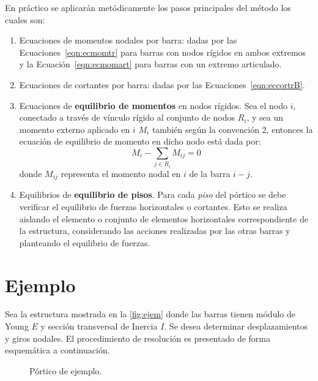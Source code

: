 En práctico se aplicarán metódicamente los pasos principales del método los cuales son:
%
\begin{enumerate}
	\item Ecuaciones de momentos nodales por barra: dadas por las Ecuaciones~\eqref{eqn:ecmomtr} para barras con nodos rígidos en ambos extremos y la Ecuación~\eqref{eqn:ecmomart} para barras con un extremo articulado. 
	
	\item Ecuaciones de cortantes por barra: dadas por las Ecuaciones~\eqref{eqn:eccortrB}.
	\item Ecuaciones de \textbf{equilibrio de momentos} en nodos rígidos. Sea el nodo $i$, conectado a través de vínculo rígido al conjunto de nodos $R_i$, y sea un momento externo aplicado en $i$ $M_i$ también según la convención 2, entonces la ecuación de equilibrio de momento en dicho nodo está dada por:
	$$
	M_i -\sum_{j\in R_i} M_{ij} = 0
	$$
	donde $M_{ij}$ representa el momento nodal en $i$ de la barra $i-j$.
	
	\item Equilibrios de \textbf{equilibrio de pisos}. Para cada \textit{piso} del pórtico se debe verificar el equilibrio de fuerzas horizontales o cortantes. Esto se realiza aislando el elemento o conjunto de elementos horizontales correspondiente de la estructura, considerando las acciones realizadas por las otras barras y planteando el equilibrio de fuerzas.
	
\end{enumerate}


\section{Ejemplo}

Sea la estructura mostrada en la \autoref{fig:ejem} donde las barras tienen módulo de Young $E$ y sección transversal de Inercia $I$. %
%
Se desea determinar desplazamientos y giros nodales. %
El procedimiento de resolución es presentado de forma esquemática a continuación.
%
\begin{figure}[htb]
	\centering
\def\svgwidth{0.6\textwidth}

	\caption{Pórtico de ejemplo.}
	\label{fig:ejem}
\end{figure}


